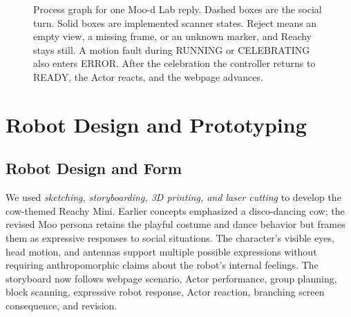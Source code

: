\documentclass[conference,12pt,letterpaper]{IEEEtran}
\begin{document}
\begin{figure}[H]
{%
}%
\ifdim\wd0>\linewidth
  \resizebox{\linewidth}{!}{\box0}%
\else
  \box0
\fi
\caption{Process graph for one Moo-d Lab reply. Dashed boxes are the social turn. Solid boxes are implemented scanner states. Reject means an empty view, a missing frame, or an unknown marker, and Reachy stays still. A motion fault during RUNNING or CELEBRATING also enters ERROR. After the celebration the controller returns to READY, the Actor reacts, and the webpage advances.}
\label{fig:architecture}
\end{figure}

\section{Robot Design and Prototyping}
\subsection{Robot Design and Form}
We used \emph{sketching, storyboarding, 3D printing, and laser cutting} to develop the cow-themed Reachy Mini. Earlier concepts emphasized a disco-dancing cow; the revised Moo persona retains the playful costume and dance behavior but frames them as expressive responses to social situations. The character's visible eyes, head motion, and antennas support multiple possible expressions without requiring anthropomorphic claims about the robot's internal feelings. The storyboard now follows webpage scenario, Actor performance, group planning, block scanning, expressive robot response, Actor reaction, branching screen consequence, and revision.
\end{document}

